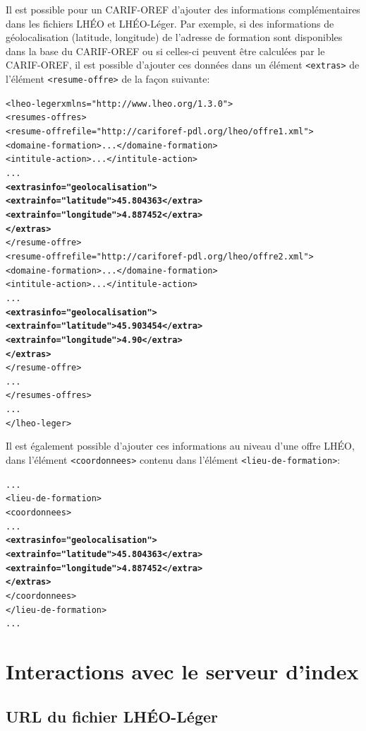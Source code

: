 \documentclass[a4paper]{report}
\begin{document}
Il est possible pour un CARIF-OREF d'ajouter des informations
complémentaires dans les fichiers LHÉO et LHÉO-Léger. Par exemple, si
des informations de géolocalisation (latitude, longitude) de l'adresse
de formation sont disponibles dans la base du CARIF-OREF ou si
celles-ci peuvent être calculées par le CARIF-OREF, il est possible
d'ajouter ces données dans un élément \texttt{<extras>} de l'élément
\texttt{<resume-offre>} de la façon suivante:

\begin{alltt}
<lheo-leger xmlns="http://www.lheo.org/1.3.0">
  <resumes-offres>
    <resume-offre file="http://cariforef-pdl.org/lheo/offre1.xml">
      <domaine-formation>...</domaine-formation>
      <intitule-action>...</intitule-action>
      ...
      \textbf{<extras info="geolocalisation">}
         \textbf{<extra info="latitude">45.804363</extra>}
         \textbf{<extra info="longitude">4.887452</extra>}
      \textbf{</extras>}
    </resume-offre>
    <resume-offre file="http://cariforef-pdl.org/lheo/offre2.xml">
      <domaine-formation>...</domaine-formation>
      <intitule-action>...</intitule-action>
      ...
      \textbf{<extras info="geolocalisation">}
         \textbf{<extra info="latitude">45.903454</extra>}
         \textbf{<extra info="longitude">4.90</extra>}
      \textbf{</extras>}
    </resume-offre>
    ...
  </resumes-offres>
  ...
</lheo-leger>
\end{alltt}

\noindent Il est également possible d'ajouter ces informations au
niveau d'une offre LHÉO, dans l'élément \texttt{<coordonnees>} contenu
dans l'élément \texttt{<lieu-de-formation>}:

\begin{alltt}
...
  <lieu-de-formation>
    <coordonnees>
      ...
      \textbf{<extras info="geolocalisation">}
         \textbf{<extra info="latitude">45.804363</extra>}
         \textbf{<extra info="longitude">4.887452</extra>}
      \textbf{</extras>}
    </coordonnees>
  </lieu-de-formation>
...
\end{alltt}

\section{Interactions avec le serveur d'index}

\subsection{URL du fichier LHÉO-Léger}
\end{document}
